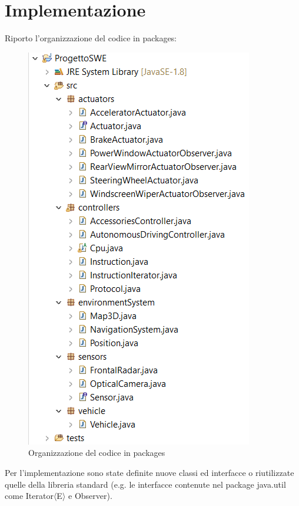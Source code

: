 \documentclass{article}
\begin{document}
\newpage
\section{Implementazione}
Riporto l'organizzazione del codice in packages: 
\begin{figure} [H]
\begin{center}
\includegraphics[scale=0.8]{Schema.png}
\end{center}
\caption{Organizzazione del codice in packages}
\end{figure}

Per l'implementazione sono state definite nuove classi ed interfacce o riutilizzate quelle della libreria standard (e.g. le interfacce  contenute nel package java.util come Iterator$\langle$E$\rangle$ e Observer).
\end{document}
